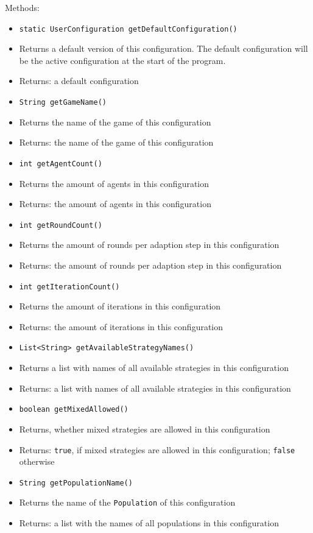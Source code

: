 \documentclass[parskip=full,11pt]{scrartcl}
\begin{document}
Methods:
\begin{itemize}\itemsep -10pt
	\item \texttt{static UserConfiguration getDefaultConfiguration()}
	\item[] Returns a default version of this configuration. The default configuration will be the active configuration at the start of the program.
	\item[] Returns: a default configuration

	\item \texttt{String getGameName()}
	\item[] Returns the name of the game of this configuration
	\item[] Returns: the name of the game of this configuration

	\item \texttt{int getAgentCount()}
	\item[] Returns the amount of agents in this configuration
	\item[] Returns: the amount of agents in this configuration
	\newpage
	\item \texttt{int getRoundCount()}
	\item[] Returns the amount of rounds per adaption step in this configuration
	\item[] Returns: the amount of rounds per adaption step in this configuration

	\item \texttt{int getIterationCount()}
	\item[] Returns the amount of iterations in this configuration
	\item[] Returns: the amount of iterations in this configuration

	\item \texttt{List<String> getAvailableStrategyNames()}
	\item[] Returns a list with names of all available strategies in this configuration
	\item[] Returns: a list with names of all available strategies in this configuration

	\item \texttt{boolean getMixedAllowed()}
	\item[] Returns, whether mixed strategies are allowed in this configuration
	\item[] Returns: \texttt{true}, if mixed strategies are allowed in this configuration; \texttt{false} otherwise

	\item \texttt{String getPopulationName()}
	\item[] Returns the name of the \texttt{Population} of this configuration
	\item[] Returns: a list with the names of all populations in this configuration


\end{itemize}
\end{document}
